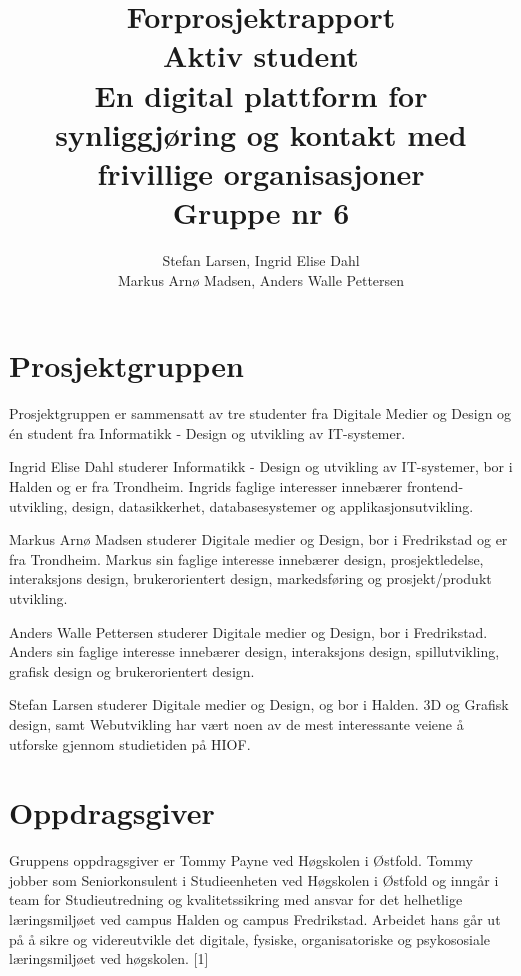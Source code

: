 \documentclass[11pt,a4paper]{report}
\begin{document}
\title{
Forprosjektrapport \\
\vspace{2cm}
Aktiv student \\
En digital plattform for synliggjøring og kontakt med frivillige organisasjoner \\
Gruppe nr 6
}
\author{
\LARGE
Stefan Larsen, Ingrid Elise Dahl  \\
\LARGE
Markus Arnø Madsen, Anders Walle Pettersen \\
}
\maketitle

\section*{Prosjektgruppen}

Prosjektgruppen er sammensatt av tre studenter fra Digitale Medier og Design og én student fra Informatikk - Design og utvikling av IT-systemer.

Ingrid Elise Dahl studerer Informatikk - Design og utvikling av IT-systemer, bor i Halden og er fra Trondheim. Ingrids faglige interesser innebærer frontend-utvikling, design, datasikkerhet, databasesystemer og applikasjonsutvikling.

Markus Arnø Madsen studerer Digitale medier og Design, bor i Fredrikstad og er fra Trondheim. Markus sin faglige interesse innebærer design, prosjektledelse, interaksjons design, brukerorientert design, markedsføring og prosjekt/produkt utvikling.

Anders Walle Pettersen studerer Digitale medier og Design, bor i Fredrikstad. Anders sin faglige interesse innebærer design, interaksjons design, spillutvikling, grafisk design og brukerorientert design.

Stefan Larsen studerer Digitale medier og Design, og bor i Halden. 3D og Grafisk design, samt Webutvikling har vært noen av de mest interessante veiene å utforske gjennom studietiden på HIOF. 


\section*{Oppdragsgiver}

Gruppens oppdragsgiver er Tommy Payne ved Høgskolen i Østfold. Tommy jobber som Seniorkonsulent i Studieenheten ved Høgskolen i Østfold og inngår i team for Studieutredning og kvalitetssikring med ansvar for det helhetlige læringsmiljøet ved campus Halden og campus Fredrikstad. Arbeidet hans går ut på å sikre og videreutvikle det digitale, fysiske, organisatoriske og psykososiale læringsmiljøet ved høgskolen. [1]
\end{document}
